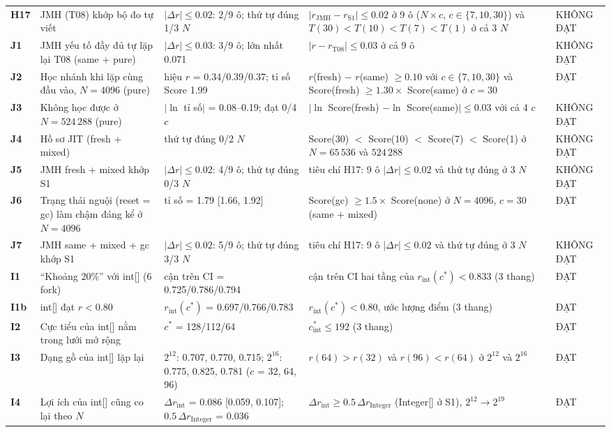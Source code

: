 \begin{longtable}{l>{\raggedright\arraybackslash}p{3.2cm}>{\raggedright\arraybackslash}p{4.2cm}>{\raggedright\arraybackslash}p{4.3cm}>{\raggedright\arraybackslash}p{1.8cm}}
\textbf{H17} & JMH (T08) khớp bộ đo tự viết & $|\Delta r|\le0.02$: 2/9 ô; thứ tự đúng 1/3 $N$ & $|r_{\mathrm{JMH}}-r_{\mathrm{S1}}|\le0.02$ ở 9 ô ($N\times c$, $c\in\{7,10,30\}$) và $T(30)<T(10)<T(7)<T(1)$ ở cả 3 $N$ & KHÔNG ĐẠT \\
\textbf{J1} & JMH yếu tố đầy đủ tự lặp lại T08 (same + pure) & $|\Delta r|\le0.03$: 3/9 ô; lớn nhất 0.071 & $|r-r_{\mathrm{T08}}|\le0.03$ ở cả 9 ô & KHÔNG ĐẠT \\
\textbf{J2} & Học nhánh khi lặp cùng đầu vào, $N=4096$ (pure) & hiệu $r$ = 0.34/0.39/0.37; tỉ số Score 1.99 & $r$(fresh) $-$ $r$(same) $\ge0.10$ với $c\in\{7,10,30\}$ và Score(fresh) $\ge1.30\times$ Score(same) ở $c=30$ & ĐẠT \\
\textbf{J3} & Không học được ở $N=524\,288$ (pure) & $|\ln$ tỉ số$|$ = 0.08–0.19; đạt 0/4 $c$ & $|\ln$ Score(fresh) $-\ln$ Score(same)$|\le0.03$ với cả 4 $c$ & KHÔNG ĐẠT \\
\textbf{J4} & Hồ sơ JIT (fresh + mixed) & thứ tự đúng 0/2 $N$ & Score(30) $<$ Score(10) $<$ Score(7) $<$ Score(1) ở $N=65\,536$ và $524\,288$ & KHÔNG ĐẠT \\
\textbf{J5} & JMH fresh + mixed khớp S1 & $|\Delta r|\le0.02$: 4/9 ô; thứ tự đúng 0/3 $N$ & tiêu chí H17: 9 ô $|\Delta r|\le0.02$ và thứ tự đúng ở 3 $N$ & KHÔNG ĐẠT \\
\textbf{J6} & Trạng thái nguội (reset = gc) làm chậm đáng kể ở $N=4096$ & tỉ số = 1.79 [1.66, 1.92] & Score(gc) $\ge1.5\times$ Score(none) ở $N=4096$, $c=30$ (same + mixed) & ĐẠT \\
\textbf{J7} & JMH same + mixed + gc khớp S1 & $|\Delta r|\le0.02$: 5/9 ô; thứ tự đúng 3/3 $N$ & tiêu chí H17: 9 ô $|\Delta r|\le0.02$ và thứ tự đúng ở 3 $N$ & KHÔNG ĐẠT \\
\textbf{I1} & ``Khoảng 20\%'' với int[] (6 fork) & cận trên CI = 0.725/0.786/0.794 & cận trên CI hai tầng của $r_{\mathrm{int}}(c^*)<0.833$ (3 thang) & ĐẠT \\
\textbf{I1b} & int[] đạt $r<0.80$ & $r_{\mathrm{int}}(c^*)$ = 0.697/0.766/0.783 & $r_{\mathrm{int}}(c^*)<0.80$, ước lượng điểm (3 thang) & ĐẠT \\
\textbf{I2} & Cực tiểu của int[] nằm trong lưới mở rộng & $c^*$ = 128/112/64 & $c^*_{\mathrm{int}}\le192$ (3 thang) & ĐẠT \\
\textbf{I3} & Dạng gồ của int[] lặp lại & $2^{12}$: 0.707, 0.770, 0.715; $2^{16}$: 0.775, 0.825, 0.781 ($c$ = 32, 64, 96) & $r(64)>r(32)$ và $r(96)<r(64)$ ở $2^{12}$ và $2^{16}$ & ĐẠT \\
\textbf{I4} & Lợi ích của int[] cũng co lại theo $N$ & $\Delta r_{\mathrm{int}}$ = 0.086 [0.059, 0.107]; $0.5\,\Delta r_{\mathrm{Integer}}$ = 0.036 & $\Delta r_{\mathrm{int}}\ge0.5\,\Delta r_{\mathrm{Integer}}$ (Integer[] ở S1), $2^{12}\to2^{19}$ & ĐẠT \\

\end{longtable}
